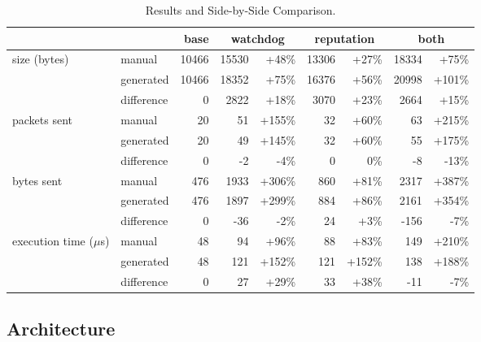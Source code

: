 \documentclass[conference]{IEEEtran}
\begin{document}
\begin{table*}[b]
  \centering
  \bgroup
  \def\arraystretch{1.3}
  \begin{tabular}{llrrrrrrr}
\toprule
              &            & base  & \multicolumn{2}{c}{watchdog} & \multicolumn{2}{c}{reputation} & \multicolumn{2}{c}{both} \\
\midrule
size (bytes)  & manual     & 10466 & 15530 &  +48\% & 13306 &  +27\% & 18334 &  +75\%\\
              & generated  & 10466 & 18352 &  +75\% & 16376 &  +56\% & 20998 & +101\%\\
\cline{2-9}
              & difference &     0 &  2822 &  +18\% &  3070 &  +23\% &  2664 &  +15\%\\
\hline
packets sent  & manual     &    20 &    51 & +155\% &    32 &  +60\% &    63 & +215\%\\
              & generated  &    20 &    49 & +145\% &    32 &  +60\% &    55 & +175\%\\
\cline{2-9}
              & difference &     0 &    -2 &   -4\% &     0 &   0\% &    -8 &   -13\%\\
\hline
bytes sent    & manual     &   476 &  1933 & +306\% &   860 &  +81\% &  2317 & +387\%\\
              & generated  &   476 &  1897 & +299\% &   884 &  +86\% &  2161 & +354\%\\
\cline{2-9}
              & difference &     0 &   -36 &   -2\% &    24 &   +3\% &  -156 &   -7\%\\
\hline
execution
time ($\mu$s) & manual     &    48 &    94 &  +96\% &    88 &  +83\% &   149 & +210\%\\
              & generated  &    48 &   121 & +152\% &   121 & +152\% &   138 & +188\%\\
\cline{2-9}
              & difference &     0 &    27 &  +29\% &    33 &  +38\% &   -11 &   -7\%\\
\bottomrule
  \end{tabular}
  \egroup
  \caption{Results and Side-by-Side Comparison.}
  \label{tbl:results}
\end{table*}

\subsection{Architecture}
\end{document}

